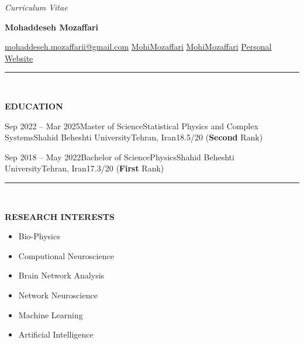 \documentclass[12pt, b4paper]{cv}
\begin{document}
\begin{center}
	\textit{Curriculum Vitae}\\
	{\Huge \textbf{Mohaddeseh Mozaffari}\par}

	\href{mailto:mohaddeseh.mozaffarii@gmail.com}{ mohaddeseh.mozaffarii@gmail.com}
	\hspace{5pt} 
	\href{https://www.linkedin.com/in/MohiMozaffari/}{ MohiMozaffari}
	\hspace{5pt} 
	\href{https://github.com/MohiMozaffari}{ MohiMozaffari}
	\hspace{5pt} 
	\href{https://mohimozaffari.github.io/}{ Personal Website} 
\end{center}


\vspace{-0.15in}
\rule{\textwidth}{1pt}\\
\vspace{-0.15in}


{\Large \textbf{EDUCATION}}
\vspace{0.1in}

\begin{education}{Sep 2022 -- Mar 2025}{Master of Science}{Statistical Physics and Complex Systems}{Shahid Beheshti University}{Tehran, Iran}{18.5/20 (\textbf{Second} Rank)}%
\end{education}

\begin{education}{Sep 2018 -- May 2022}{Bachelor of Science}{Physics}{Shahid Beheshti University}{Tehran, Iran}{17.3/20 (\textbf{First} Rank)}
\end{education}


\vspace{-0.15in}
\rule{\textwidth}{1pt}\\
\vspace{-0.15in}


{\Large \textbf{RESEARCH INTERESTS}}

\vspace{-5pt}
\begin{multicols}{3}
	\begin{itemize}
		\setlength\itemsep{-1pt}
				\item Bio-Physics
				\item Computional Neuroscience
				\item Brain Network Analysis
				\item Network Neuroscience
				\item Machine Learning
				\item Artificial Intelligence
	\end{itemize}
\end{multicols}
\end{document}

